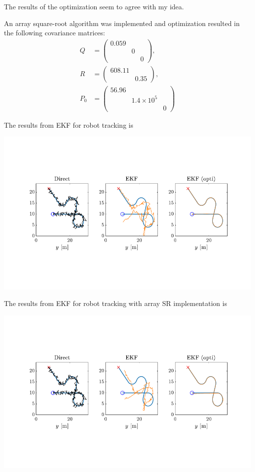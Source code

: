 The results of the optimization seem to agree with my idea.

An array square-root algorithm was implemented and optimization resulted in the following covariance matrices:
\begin{align*}
    Q &= \begin{pmatrix}
        0.059 & & \\ & 0 & \\ & & 0
    \end{pmatrix}, \\
    R &= \begin{pmatrix}
        608.11 & \\ & 0.35
    \end{pmatrix}, \\
    P_0 &= \begin{pmatrix}
        56.96 & & \\ & 1.4\times10^5 & \\ & & 0
    \end{pmatrix}
\end{align*}

The results from EKF for robot tracking is 

\includegraphics{figures/EKF_Le3.pdf}

The results from EKF for robot tracking with array SR implementation is 

\includegraphics{figures/EKF_Le3_SR.pdf}


